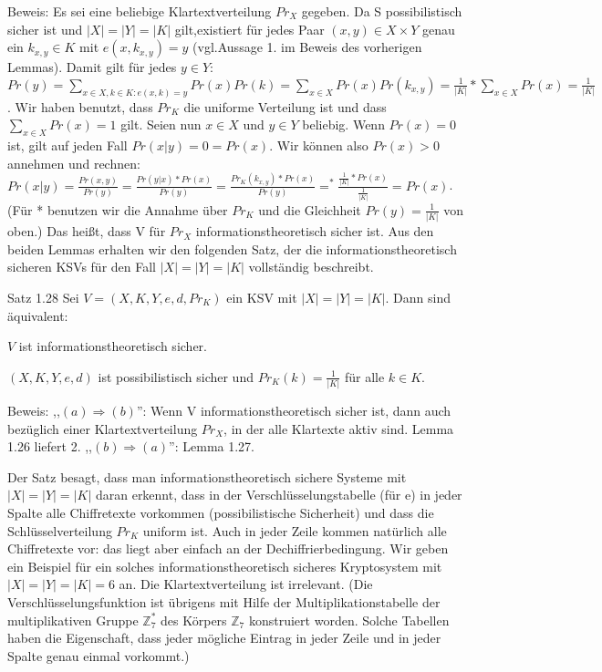 \documentclass[a4paper]{article}
\begin{document}
\begin{multicols}{3}
    Beweis: Es sei eine beliebige Klartextverteilung $Pr_X$ gegeben. Da S possibilistisch sicher ist und $|X|=|Y|=|K|$ gilt,existiert für jedes Paar $(x,y)\in X\times Y$ genau ein $k_{x,y}\in K$ mit $e(x,k_{x,y}) =y$ (vgl.Aussage 1. im Beweis des vorherigen Lemmas).
    Damit gilt für jedes $y\in Y$:$Pr(y)=\sum_{x\in X,k\in K:e(x,k)=y} Pr(x)Pr(k) =\sum_{x\in X} Pr(x) Pr(k_{x,y})=\frac{1}{|K|}* \sum_{x\in X} Pr(x) = \frac{1}{|K|}$.
    Wir haben benutzt, dass $Pr_K$ die uniforme Verteilung ist und dass $\sum_{x\in X} Pr(x) = 1$ gilt.
    Seien nun $x\in X$ und $y\in Y$ beliebig. Wenn $Pr(x)=0$ ist, gilt auf jeden Fall $Pr(x|y)=0=Pr(x)$. Wir können also $Pr(x)> 0$ annehmen und rechnen: $Pr(x|y) =\frac{Pr(x,y)}{Pr(y)}=\frac{Pr(y|x)*Pr(x)}{Pr(y)}=\frac{Pr_K(k_{x,y})*Pr(x)}{Pr(y)}=^* \frac{\frac{1}{|K|}*Pr(x)}{\frac{1}{|K|}}=Pr(x)$.
    (Für * benutzen wir die Annahme über $Pr_K$ und die Gleichheit $Pr(y)=\frac{1}{|K|}$ von oben.) Das heißt, dass V  für $Pr_X$ informationstheoretisch sicher ist.
    Aus den beiden Lemmas erhalten wir den folgenden Satz, der die informationstheoretisch sicheren KSVs für den Fall $|X|=|Y|=|K|$ vollständig beschreibt.

    Satz 1.28 Sei $V= (X,K,Y,e,d,Pr_K)$ ein KSV mit $|X|=|Y|=|K|$. Dann sind äquivalent:
    \begin{enumerate*}
        \item $V$ ist informationstheoretisch sicher.
        \item  $(X,K,Y,e,d)$ ist possibilistisch sicher und $Pr_K(k)=\frac{1}{|K|}$ für alle $k\in K$.
    \end{enumerate*}

    Beweis:  ,,$(a)\Rightarrow (b)$'': Wenn V informationstheoretisch sicher ist, dann auch bezüglich einer Klartextverteilung $Pr_X$, in der alle Klartexte aktiv sind. Lemma 1.26 liefert 2. ,,$(b)\Rightarrow (a)$'': Lemma 1.27.

    Der Satz besagt, dass man informationstheoretisch sichere Systeme mit $|X|=|Y|=|K|$ daran erkennt, dass in der Verschlüsselungstabelle (für e) in jeder Spalte alle Chiffretexte vorkommen (possibilistische Sicherheit) und dass die Schlüsselverteilung $Pr_K$ uniform ist. Auch in jeder Zeile kommen natürlich alle Chiffretexte vor: das liegt aber einfach an der Dechiffrierbedingung.
    Wir geben ein Beispiel für ein solches informationstheoretisch sicheres Kryptosystem mit $|X|=|Y|=|K|=6$ an. Die Klartextverteilung ist irrelevant. (Die Verschlüsselungsfunktion ist übrigens mit Hilfe der Multiplikationstabelle der multiplikativen Gruppe $\mathbb{Z}^*_7$ des Körpers $\mathbb{Z}_7$ konstruiert worden. Solche Tabellen haben die Eigenschaft, dass jeder mögliche Eintrag in jeder Zeile und in jeder Spalte genau einmal vorkommt.)


\end{multicols}
\end{document}
